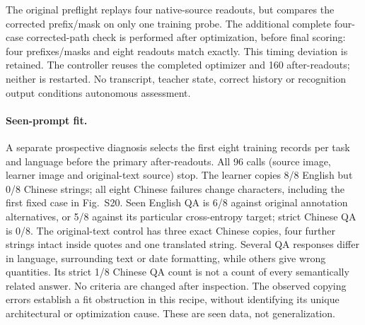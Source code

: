 \documentclass[10pt,a4paper]{article}
\begin{document}
The original preflight replays four native-source readouts, but compares the
corrected prefix/mask on only one training probe. The additional complete
four-case corrected-path check is performed after optimization, before final
scoring: four prefixes/masks and eight readouts match exactly. This timing
deviation is retained. The controller reuses the completed optimizer and
160 after-readouts; neither is restarted. No transcript, teacher state,
correct history or recognition output conditions autonomous assessment.

\paragraph{Seen-prompt fit.}
A separate prospective diagnosis selects the first eight training records
per task and language before the primary after-readouts. All 96 calls
(source image, learner image and original-text source) stop. The learner
copies 8/8 English but 0/8 Chinese strings; all eight Chinese failures change
characters, including the first fixed case in Fig.~S20. Seen English QA
is 6/8 against original annotation alternatives, or 5/8 against its particular
cross-entropy target; strict Chinese QA is 0/8. The original-text control has
three exact Chinese copies, four further strings intact inside quotes and
one translated string. Several QA responses differ in language, surrounding
text or date formatting, while others give wrong quantities. Its strict 1/8
Chinese QA count is not a count of every semantically related answer.
No criteria are changed after inspection. The observed copying errors
establish a fit obstruction in this recipe, without identifying its unique
architectural or optimization cause. These are seen data, not generalization.
\end{document}
